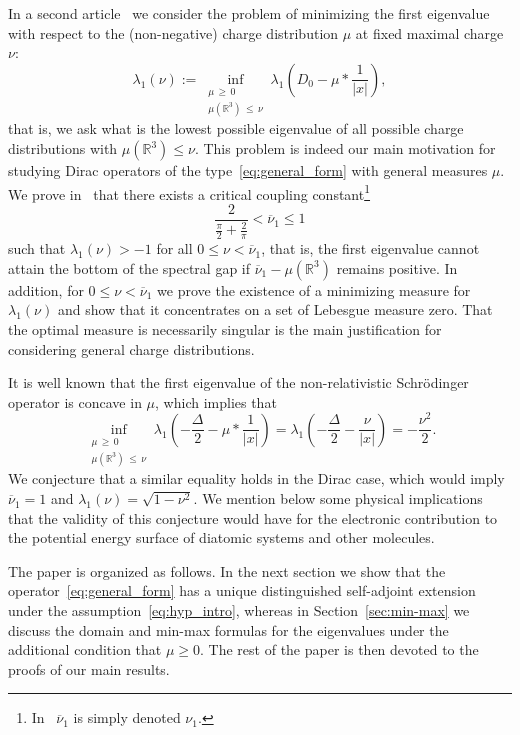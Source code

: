 \documentclass[10pt]{amsart}
\theoremstyle{definition}
\newcommand{\R}{\mathbb{R}}
\newcommand\1{{\ensuremath {\mathds 1} }}
\renewcommand{\geq}{\geqslant}
\renewcommand{\leq}{\leqslant}
\begin{document}
In a second article~\cite{EstLewSer-21b} we consider the problem of minimizing the first eigenvalue with respect to the (non-negative) charge distribution $\mu$ at fixed maximal charge $\nu$:
\[
\lambda_1(\nu):=\inf_{\substack{\mu\,\geq\,0\\
\mu\left(\R^3\right)\,\leq\,\nu}}\lambda_1\left(D_0-\mu\ast\frac1{|x|}\right),
\]
that is, we ask what is the lowest possible eigenvalue of all possible charge distributions with $\mu(\R^3)\leq\nu$. This problem is indeed our main motivation for studying Dirac operators of the type~\eqref{eq:general_form} with general measures $\mu$. We prove in~\cite{EstLewSer-21b} that there exists a critical coupling constant\footnote{In~\cite{EstLewSer-21b} $\overline\nu_1$ is simply denoted $\nu_1$.}
\[
\frac{2}{\frac\pi2+\frac2\pi}<\overline{\nu}_1\leq1
\]
such that $\lambda_1(\nu)>-1$ for all $0\leq \nu<\overline\nu_1$, that is, the first eigenvalue cannot attain the bottom of the spectral gap if $\overline\nu_1-\mu(\R^3)$ remains positive. In addition, for $0\leq\nu<\overline\nu_1$ we prove the existence of a minimizing measure for $\lambda_1(\nu)$ and show that it concentrates on a set of Lebesgue measure zero. That the optimal measure is necessarily singular is the main justification for considering general charge distributions.

It is well known that the first eigenvalue of the non-relativistic Schrödinger operator is concave in $\mu$, which implies that
\[
\inf_{\substack{\mu\,\geq\,0\\
\mu\left(\R^3\right)\,\leq\,\nu}}\lambda_1\left(-\frac\Delta2-\mu\ast\frac1{|x|}\right)=\lambda_1\left(-\frac\Delta2-\frac\nu{|x|}\right)=-\frac{\nu^2}{2}.
\]
We conjecture that a similar equality holds in the Dirac case, which would imply $\overline\nu_1=1$ and $\lambda_1(\nu)=\sqrt{1-\nu^2}$. We mention below some physical implications that the validity of this conjecture would have for the electronic contribution to the potential energy surface of diatomic systems and other molecules.


The paper is organized as follows. In the next section we show that the operator~\eqref{eq:general_form} has a unique distinguished self-adjoint extension under the assumption~\eqref{eq:hyp_intro}, whereas in Section~\ref{sec:min-max} we discuss the domain and min-max formulas for the eigenvalues under the additional condition that $\mu\geq0$. The rest of the paper is then devoted to the proofs of our main results.
\end{document}
